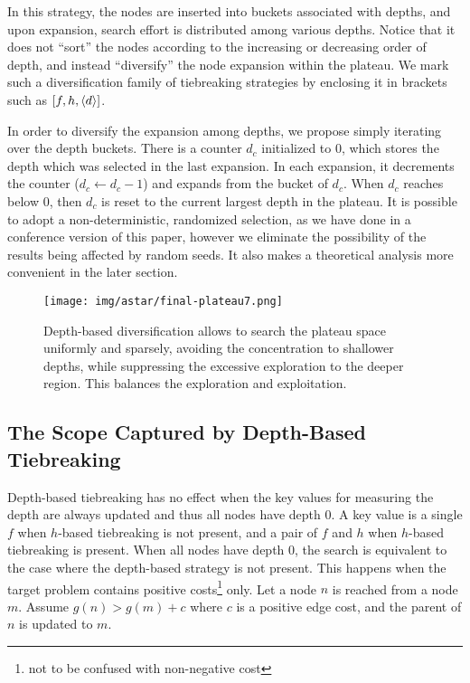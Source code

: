 In this strategy, the nodes are inserted into buckets
associated with depths, and upon expansion, search effort is distributed
among various depths. Notice that it does not ``sort'' the nodes
according to the increasing or decreasing order of depth,
and instead ``diversify'' the node expansion
within the plateau. We mark such a diversification family of
tiebreaking strategies by enclosing it in brackets such as $[f,h,{\left<d\right>}]$.

In order to diversify the expansion among depths, we propose simply
iterating over the depth buckets. There is a counter $d_c$ initialized
to 0, which stores the depth which was selected in the last expansion.
In each expansion, it decrements the counter ($d_c\leftarrow d_c-1$) and
expands from the bucket of $d_c$. When $d_c$ reaches below 0, then $d_c$
is reset to the current largest depth in the plateau.
It is possible to adopt a
non-deterministic, randomized selection, as we have done in a conference
version of this paper, however we eliminate the possibility of the
results being affected by random seeds. It also makes a theoretical
analysis more convenient in the later section.

\begin{figure}[htbp]
 \centering
 \texttt{[image: img/astar/final-plateau7.png]}
 \caption{Depth-based diversification allows \astar to search the plateau space
 uniformly and sparsely, avoiding the concentration to shallower depths, while
 suppressing the excessive exploration to the deeper region. This
 balances the exploration and exploitation.}
 \label{fig:plateau-depiction-all-optimal}
\end{figure}


\subsection{The Scope Captured by Depth-Based Tiebreaking}

Depth-based tiebreaking has no effect when the key values for measuring
the depth are always updated and thus all nodes have depth 0. A key
value is a single $f$ when $h$-based tiebreaking is not present, and a
pair of $f$ and $h$ when $h$-based tiebreaking is present. When all
nodes have depth 0, the search is equivalent to the case where 
the depth-based strategy is not present.
% 
This happens when the target problem contains
positive costs\footnote{not to be confused with non-negative cost} only.
Let a node $n$ is reached from a node $m$. Assume
 $g(n)>g(m)+c$ where $c$ is a positive edge cost, and the parent of $n$
 is updated to $m$.

